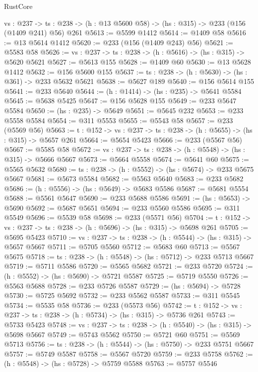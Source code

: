 \begin{lexlean}{RustCore}
\begin{coremodule}
  {vs : @237} ->
  {ts : @238} -> (h : @13 @5600 @58) -> (hs : @315) -> @233 (@156 (@1409 @241) @56) @261
@5613 := @5599 @1412
@5614 := @1409 @58
@5616 := @13 @5614 @1412
@5620 := @233 (@156 (@1409 @243) @56)
@5621 := @5583 @58
@5626 := {vs : @237} -> {ts : @238} -> (h : @5616) -> (hs : @315) -> @5620 @5621
@5627 := @5613 @155
@5628 := @1409 @60
@5630 := @13 @5628 @1412
@5632 := @156 @5600 @155
@5637 := {ts : @238} -> (h : @5630) -> (hs : @361) -> @233 @5632 @5621
@5638 := @5627 @189
@5640 := @156 @5614 @155
@5641 := @233 @5640
@5644 := (h : @1414) -> (hs : @235) -> @5641 @5584
@5645 := @5638 @5425
@5647 := @156 @5628 @155
@5649 := @233 @5647 @5584
@5650 := (hs : @235) -> @5649
@5651 := @5645 @232
@5653 := @233 @5558 @5584
@5654 := @311 @5553
@5655 := @5543 @58
@5657 := @233 (@5569 @56)
@5663 := {t : @152} -> {vs : @237} -> {ts : @238} -> (h : @5655) -> (hs : @315) -> @5657 @261
@5664 := @5654 @5423
@5666 := @233 (@5567 @56)
@5667 := @5585 @58
@5672 := {vs : @237} -> {ts : @238} -> (h : @5548) -> (hs : @315) -> @5666 @5667
@5673 := @5664 @5558
@5674 := @5641 @60
@5675 := @5565 @5632
@5680 := {ts : @238} -> (h : @5552) -> (hs : @5674) -> @233 @5675 @5667
@5681 := @5673 @5584
@5682 := @5563 @5640
@5683 := @233 @5682
@5686 := (h : @5556) -> (hs : @5649) -> @5683 @5586
@5687 := @5681 @5554
@5688 := @5561 @5647
@5690 := @233 @5688 @5586
@5691 := (hs : @5653) -> @5690
@5692 := @5687 @5651
@5694 := @233 @5560 @5586
@5695 := @311 @5549
@5696 := @5539 @58
@5698 := @233 (@5571 @56)
@5704 := {t : @152} -> {vs : @237} -> {ts : @238} -> (h : @5696) -> (hs : @315) -> @5698 @261
@5705 := @5695 @5423
@5710 := {vs : @237} -> {ts : @238} -> (h : @5544) -> (hs : @315) -> @5657 @5667
@5711 := @5705 @5560
@5712 := @5683 @60
@5713 := @5567 @5675
@5718 := {ts : @238} -> (h : @5548) -> (hs : @5712) -> @233 @5713 @5667
@5719 := @5711 @5586
@5720 := @5565 @5682
@5721 := @233 @5720
@5724 := (h : @5552) -> (hs : @5690) -> @5721 @5587
@5725 := @5719 @5550
@5726 := @5563 @5688
@5728 := @233 @5726 @5587
@5729 := (hs : @5694) -> @5728
@5730 := @5725 @5692
@5732 := @233 @5562 @5587
@5733 := @311 @5545
@5734 := @5535 @58
@5736 := @233 (@5573 @56)
@5742 := {t : @152} -> {vs : @237} -> {ts : @238} -> (h : @5734) -> (hs : @315) -> @5736 @261
@5743 := @5733 @5423
@5748 := {vs : @237} -> {ts : @238} -> (h : @5540) -> (hs : @315) -> @5698 @5667
@5749 := @5743 @5562
@5750 := @5721 @60
@5751 := @5569 @5713
@5756 := {ts : @238} -> (h : @5544) -> (hs : @5750) -> @233 @5751 @5667
@5757 := @5749 @5587
@5758 := @5567 @5720
@5759 := @233 @5758
@5762 := (h : @5548) -> (hs : @5728) -> @5759 @5588
@5763 := @5757 @5546

\end{coremodule}
\end{lexlean}
